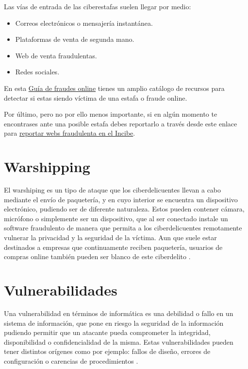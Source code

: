\documentclass[
  spanish,
  a4paper,
  openany]{book}
\begin{document}
Las vías de entrada de las ciberestafas suelen llegar por medio:

\begin{itemize}
\item
  Correos electrónicos o mensajería instantánea.
\item
  Plataformas de venta de segunda mano.
\item
  Web de venta fraudulentas.
\item
  Redes sociales.
\end{itemize}

En esta \href{https://www.osi.es/es/guia-fraudes-online}{Guía de fraudes online} tienes un amplio catálogo de recursos para detectar si estas siendo víctima de una estafa o fraude online.

Por último, pero no por ello menos importante, si en algún momento te encontrases ante una posible estafa debes reportarlo a través desde este enlace para \href{https://www.incibe.es/protege-tu-empresa/reporte-fraude}{reportar webs fraudulenta en el Incibe}.

\hypertarget{warshipping}{%
\section{Warshipping}\label{warshipping}}

El warshiping es un tipo de ataque que los ciberdelicuentes llevan a cabo mediante el envío de paquetería, y en cuyo interior se encuentra un dispositivo electrónico, pudiendo ser de diferente naturaleza. Estos pueden contener cámara, micrófono o simplemente ser un dispositivo, que al ser conectado instale un software fraudulento de manera que permita a los ciberdelicuentes remotamente vulnerar la privacidad y la seguridad de la víctima. Aun que suele estar destinados a empresas que continuamente reciben paquetería, usuarios de compras online también pueden ser blanco de este ciberdelito \citep{INCI-warshipping}.

\hypertarget{vulnerabilidades}{%
\section{Vulnerabilidades}\label{vulnerabilidades}}

Una vulnerabilidad en términos de informática es una debilidad o fallo en un sistema de información, que pone en riesgo la seguridad de la información pudiendo permitir que un atacante pueda comprometer la integridad, disponibilidad o confidencialidad de la misma. Estas vulnerabilidades pueden tener distintos orígenes como por ejemplo: fallos de diseño, errores de configuración o carencias de procedimientos \citep{INCI-vulnerabilidad}.
\end{document}
